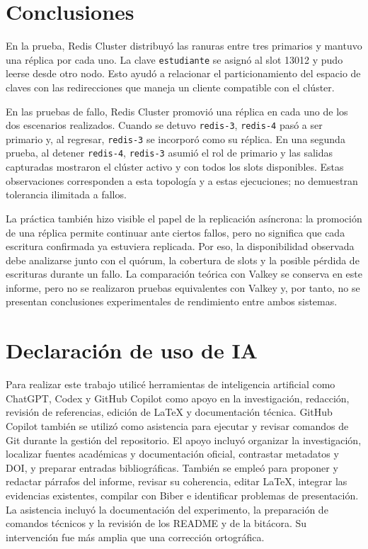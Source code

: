\documentclass[12pt,a4paper]{article}
\begin{document}
\section{Conclusiones}

En la prueba, Redis Cluster distribuyó las ranuras entre tres primarios y
mantuvo una réplica por cada uno. La clave \texttt{estudiante} se asignó al
slot 13012 y pudo leerse desde otro nodo. Esto ayudó a relacionar el
particionamiento del espacio de claves con las redirecciones que maneja un
cliente compatible con el clúster.

En las pruebas de fallo, Redis Cluster promovió una réplica en cada uno de los
dos escenarios realizados. Cuando se detuvo \texttt{redis-3}, \texttt{redis-4}
pasó a ser primario y, al regresar, \texttt{redis-3} se incorporó como su
réplica. En una segunda prueba, al detener \texttt{redis-4}, \texttt{redis-3}
asumió el rol de primario y las salidas capturadas mostraron el clúster activo
y con todos los slots disponibles. Estas observaciones corresponden a esta
topología y a estas ejecuciones; no demuestran tolerancia ilimitada a fallos.

La práctica también hizo visible el papel de la replicación asíncrona: la
promoción de una réplica permite continuar ante ciertos fallos, pero no
significa que cada escritura confirmada ya estuviera replicada. Por eso, la
disponibilidad observada debe analizarse junto con el quórum, la cobertura de
slots y la posible pérdida de escrituras durante un fallo. La comparación
teórica con Valkey se conserva en este informe, pero no se realizaron pruebas
equivalentes con Valkey y, por tanto, no se presentan conclusiones
experimentales de rendimiento entre ambos sistemas.

\section{Declaración de uso de IA}

Para realizar este trabajo utilicé herramientas de inteligencia artificial como ChatGPT, Codex y GitHub Copilot como apoyo en la investigación, redacción, revisión de referencias, edición de LaTeX y documentación técnica. GitHub Copilot también se utilizó como asistencia para ejecutar y revisar comandos de Git durante la gestión del repositorio. El apoyo incluyó organizar la investigación, localizar fuentes académicas y documentación oficial, contrastar metadatos y DOI, y preparar entradas bibliográficas. También se empleó para proponer y redactar párrafos del informe, revisar su coherencia, editar LaTeX, integrar las evidencias existentes, compilar con Biber e identificar problemas de presentación. La asistencia incluyó la documentación del experimento, la preparación de comandos técnicos y la revisión de los README y de la bitácora. Su intervención fue más amplia que una corrección ortográfica.
\end{document}

